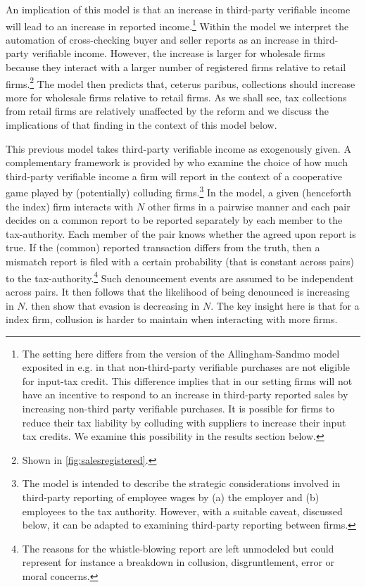 An implication of this model is that an increase in third-party verifiable income will lead to an increase in reported income.\footnote{The setting here differs from the version of the Allingham-Sandmo model exposited in e.g. \cite{Carrilloetal:2017} in that non-third-party verifiable purchases are not eligible for input-tax credit. This difference implies that in our setting firms will not have an incentive to respond to an increase in third-party
reported sales by increasing non-third party verifiable purchases. It is possible for firms to reduce their tax liability by colluding with suppliers to increase their input tax credits. We examine this possibility in the results section below.} Within the model we interpret the automation of cross-checking buyer and seller reports as an increase in third-party verifiable income. However, the increase is larger for wholesale firms because they interact with a larger number of registered firms relative to retail firms.\footnote{Shown in \cref{fig:salesregistered}.} The model then predicts that, ceterus paribus, collections should increase more for wholesale firms relative to retail firms. As we shall see, tax collections from retail firms are relatively unaffected by the reform and we discuss the implications of that finding in the context of this model below.

This previous model takes third-party verifiable income as exogenously given. A complementary framework is provided by \cite{kleven2016can} who examine the choice of how much third-party verifiable income a firm will report in the context of a cooperative game played by (potentially) colluding firms.\footnote{The model is intended to describe the strategic considerations involved in third-party reporting of employee wages by (a) the employer and (b) employees to the tax authority. However, with a suitable caveat, discussed below, it can be adapted to examining third-party reporting between firms.} In the model, a given (henceforth the index) firm interacts with $N$
other firms in a pairwise manner and each pair decides on a common report to be reported separately by each member to the tax-authority. Each member of the pair knows whether the agreed upon report is true. If the (common) reported transaction differs from the truth, then a mismatch report is filed with a certain probability
(that is constant across pairs) to the tax-authority.\footnote{The reasons for the whistle-blowing report are left unmodeled but could represent for instance a breakdown in collusion, disgruntlement, error or moral concerns.} Such denouncement events are assumed to be independent across pairs. It then follows that the likelihood of being denounced is increasing in $N$. \cite{kleven2016can} then show that evasion is decreasing in $N$. The key insight here is that for a index firm, collusion is harder to maintain when interacting with more firms.


